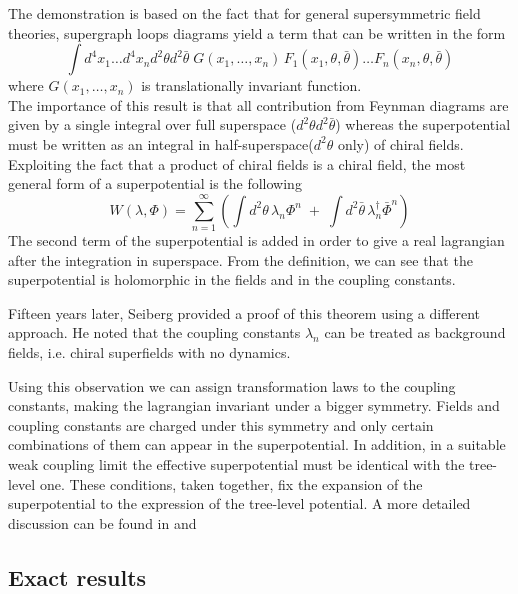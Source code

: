 The demonstration is based on the fact that for general supersymmetric field theories, supergraph loops diagrams yield a term that can be written in the form
\begin{equation}
\int  d^4 x_1 \dots d^4 x_n d^2 \theta d^2 \bar{\theta} \; G (x_1 , \dots , x_n) \,F_1 ( x_1, \theta, \bar{\theta}) \dots  F_n ( x_n, \theta, \bar{\theta}) 
\end{equation} 
where $G (x_1 , \dots , x_n) $ is translationally invariant function.\\
The importance of this result is that all contribution from Feynman diagrams are given by a single integral over full superspace ($d^2 \theta d^2 \bar{\theta} $) whereas the superpotential must be written as an integral in half-superspace($d^2 \theta $ only) of chiral fields.
Exploiting the fact that a product of chiral fields is a chiral field, the most general form of a superpotential is the following
\begin{equation}
 W (\lambda, \Phi) = \sum_{n=1}^{\infty} \left( \int d^2 \theta \, \lambda_n \Phi^n  \; +\;  \int d^2 \bar{\theta} \, \lambda_n^{\dagger} \bar{\Phi}^n \right)
 \end{equation} 
 The second term of the superpotential is added in order to give a real lagrangian after the integration in superspace.
From the definition, we can see that the superpotential is holomorphic in the fields and in the coupling constants.

Fifteen years later, Seiberg \cite{Seiberg:1993vc} provided a proof of this theorem using a different approach.
He noted that the coupling constants $\lambda_n$ can be treated as background fields, i.e. chiral superfields with no dynamics.




Using this observation we can assign transformation laws to the coupling constants, making the lagrangian invariant under a bigger symmetry.
Fields and coupling constants are charged under this symmetry and only certain combinations of them can appear in the superpotential.
In addition, in a suitable weak coupling limit the effective superpotential must be identical with the tree-level one.
These conditions, taken together, fix the expansion of the superpotential to the expression of the tree-level potential.
A more detailed discussion can be found in \cite{Seiberg:1994bp} and \cite{Intriligator:1995au}





\subsection{Exact results}







